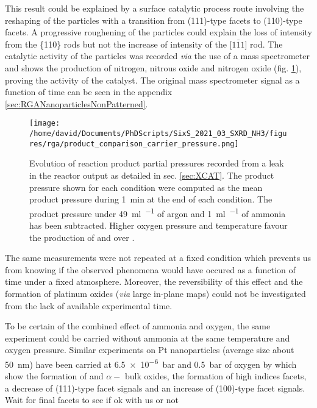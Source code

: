 This result could be explained by a surface catalytic process route involving the reshaping of the particles with a transition from (111)-type facets to (110)-type facets.
A progressive roughening of the particles could explain the loss of intensity from the \{110\} rods but not the increase of intensity of the [$1\bar{1}1$] rod.
The catalytic activity of the particles was recorded \textit{via} the use of a mass spectrometer and shows the production of nitrogen, nitrous oxide and nitrogen oxide (fig. \ref{fig:RGASXRDNanoparticlesComparison}), proving the activity of the catalyst.
The original mass spectrometer signal as a function of time can be seen in the appendix \ref{sec:RGANanoparticlesNonPatterned}.

\begin{figure}[!htb]
    \centering
    \texttt{[image: /home/david/Documents/PhDScripts/SixS\_2021\_03\_SXRD\_NH3/figures/rga/product\_comparison\_carrier\_pressure.png]}
    \caption{
        Evolution of reaction product partial pressures  recorded from a leak in the reactor output as detailed in sec. \ref{sec:XCAT}.
        The product pressure shown for each condition were computed as the mean product pressure during \qty{1}{\minute} at the end of each condition.
        The product pressure under \qty{49}{\ml\per\min} of argon and \qty{1}{\ml\per\min} of ammonia has been subtracted.
        Higher oxygen pressure and temperature favour the production of \nitrousoxide and \nitricoxide over \nitrogen.
    }
    \label{fig:RGASXRDNanoparticlesComparison}
\end{figure}

The same measurements were not repeated at a fixed condition which prevents us from knowing if the observed phenomena would have occured as a function of time under a fixed atmosphere.
Moreover, the reversibility of this effect and the formation of platinum oxides (\textit{via} large in-plane maps) could not be investigated from the lack of available experimental time.

To be certain of the combined effect of ammonia and oxygen, the same experiment could be carried without ammonia at the same temperature and oxygen pressure.
Similar experiments on Pt nanoparticles (average size about \qty{50}{\nm}) have been carried at \qty{6.5e-6}{\bar} and \qty{0.5}{\bar} of oxygen by \cite{Hejral2013} which show the formation of  and $\alpha-$ bulk oxides, the formation of high indices facets, a decrease of (111)-type facet signals and an increase of (100)-type facet signals.
\textcolor{Important}{Wait for final facets to see if ok with us or not}


